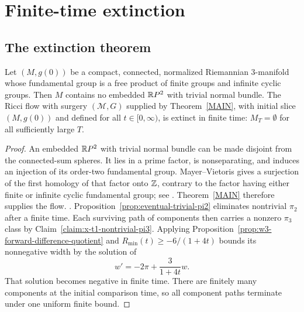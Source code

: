 \chapter{Finite-time extinction}
\label{chap:finite-time-extinction}
\label{energy}

\section{The extinction theorem}

\begin{theorem}
\label{thm:finite-time-extinction-main}
\label{extinct}

Let $(M,g(0))$ be a compact, connected, normalized Riemannian $3$-manifold
whose fundamental group is a free product of finite groups and infinite cyclic
groups. Then $M$ contains no embedded $\mathbb{R} P^2$ with trivial normal bundle. The
Ricci flow with surgery $({\mathcal M},G)$ supplied by
Theorem~\ref{MAIN}, with initial slice $(M,g(0))$ and defined for all
$t\in[0,\infty)$, is extinct in finite time: $M_T=\emptyset$ for all
sufficiently large $T$.
\end{theorem}
\begin{proof}

\sketch An embedded $\mathbb{R} P^2$ with trivial normal bundle can be made disjoint
from the connected-sum spheres. It lies in a prime factor, is nonseparating,
and induces an injection of its order-two fundamental group. Mayer--Vietoris
gives a surjection of the first homology of that factor onto $\mathbb{Z}$, contrary
to the factor having either finite or infinite cyclic fundamental group; see
\cite{Hatcher,Hempel}. Theorem~\ref{MAIN} therefore supplies the flow.
\cite{AG,AG,AG,AG,AG,ColdingMinicozzi,HamiltonNSRF3M,Hempel,Hildebrandt,Jost,Perelman3,Perelman3,Perelman3,Perelman3,Perelman3,SacksUhlenbeck,SacksUhlenbeck,SacksUhlenbeck,SacksUhlenbeck,SchoenYau}.
Proposition~\ref{prop:eventual-trivial-pi2} eliminates nontrivial $\pi_2$ after
a finite time. Each surviving path of components then carries a nonzero
$\pi_3$ class by Claim~\ref{claim:x-t1-nontrivial-pi3}. Applying
Proposition~\ref{prop:w3-forward-difference-quotient} and
$R_{\min}(t)\ge-6/(1+4t)$ bounds its nonnegative width by the solution of
\[
w'=-2\pi+\frac{3}{1+4t}w.
\]
That solution becomes negative in finite time. There are finitely many
components at the initial comparison time, so all component paths terminate
under one uniform finite bound.
\end{proof}

